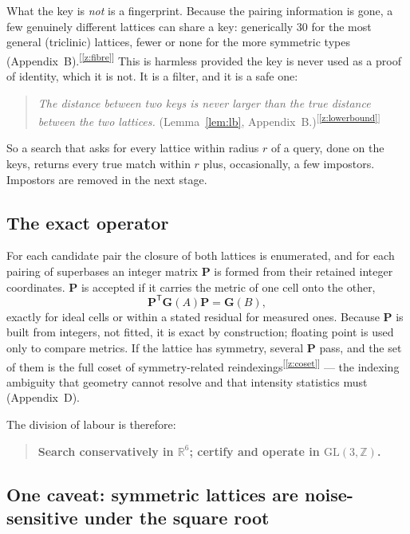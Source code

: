 \documentclass[11pt]{article}
\newcommand{\Gmet}{\mathbf{G}}
\newcommand{\Pop}{\mathbf{P}}
\newcommand{\chk}[1]{\textsuperscript{[\ref{#1}]}}
\begin{document}
What the key is \emph{not} is a fingerprint. Because the pairing information is gone, a few genuinely different lattices can share a key: generically 30 for the most general (triclinic) lattices, fewer or none for the more symmetric types (Appendix~B).\chk{z:fibre} This is harmless provided the key is never used as a proof of identity, which it is not. It is a filter, and it is a safe one:

\begin{quote}
\emph{The distance between two keys is never larger than the true distance between the two lattices.} (Lemma~\ref{lem:lb}, Appendix~B.)\chk{z:lowerbound}
\end{quote}

So a search that asks for every lattice within radius $r$ of a query, done on the keys, returns every true match within $r$ plus, occasionally, a few impostors. Impostors are removed in the next stage.

\subsection{The exact operator}

For each candidate pair the closure of both lattices is enumerated, and for each pairing of superbases an integer matrix $\Pop$ is formed from their retained integer coordinates. $\Pop$ is accepted if it carries the metric of one cell onto the other,
\[
\Pop^{\mathsf T}\Gmet(A)\Pop=\Gmet(B),
\]
exactly for ideal cells or within a stated residual for measured ones. Because $\Pop$ is built from integers, not fitted, it is exact by construction; floating point is used only to compare metrics. If the lattice has symmetry, several $\Pop$ pass, and the set of them is the full coset of symmetry-related reindexings\chk{z:coset} --- the indexing ambiguity that geometry cannot resolve and that intensity statistics must (Appendix~D).

The division of labour is therefore:
\begin{quote}
\textbf{Search conservatively in $\mathbb R^6$; certify and operate in $\mathrm{GL}(3,\mathbb Z)$.}
\end{quote}

\subsection{One caveat: symmetric lattices are noise-sensitive under the square root}
\end{document}
